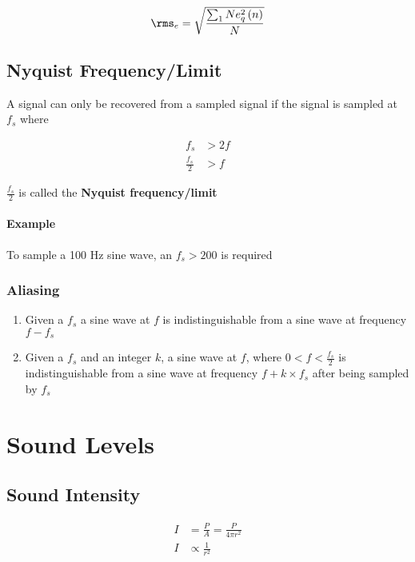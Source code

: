       \begin{equation}
        \rms_{e} = \sqrt{\frac{\sum_{1}{N} e_{q}^{2}\left( n \right)}{N}}
      \end{equation}

  \subsection{Nyquist Frequency/Limit}

    A signal can only be recovered from a sampled signal if the signal is
    sampled at $ f_{s} $ where

    \begin{align}
      f_{s} &> 2 f \\
      \frac{f_{s}}{2} &> f
    \end{align}

    $ \frac{f_{s}}{2} $ is called the \textbf{Nyquist frequency/limit}

    \paragraph{Example}
    To sample a 100 Hz sine wave, an $ f_{s} > 200 $ is required

    \subsubsection{Aliasing}

      \begin{enumerate}
        \item Given a $ f_{s} $ a sine wave at $ f $ is indistinguishable
        from a sine wave at frequency $ f - f_{s} $
        \item Given a $ f_{s} $ and an integer $ k $, a sine wave at
        $ f $, where $ 0 < f < \frac{f_{s}}{2} $ is indistinguishable
        from a sine wave at frequency $ f + k \times f_{s} $ after being sampled
        by $ f_{s} $
      \end{enumerate}

\section{Sound Levels}

  \subsection{Sound Intensity}

    \begin{align}
      I &= \frac{P}{A} = \frac{P}{4 \pi r^{2}} \\
      I &\propto \frac{1}{r^{2}}
    \end{align}

